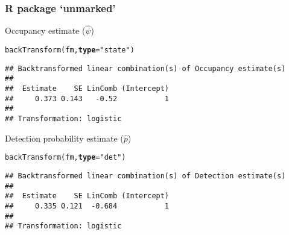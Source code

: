 \documentclass[color=usenames,dvipsnames]{beamer}\usepackage[]{graphicx}\usepackage[]{xcolor}
\makeatletter
\newcommand{\hlsng}[1]{\textcolor[rgb]{0.749,0.012,0.012}{#1}}%
\newcommand{\hldef}[1]{\textcolor[rgb]{0,0,0}{#1}}%
\newcommand{\hlkwc}[1]{\textcolor[rgb]{0,0,0}{\textbf{#1}}}%
\newcommand{\hlkwd}[1]{\textcolor[rgb]{0.004,0.004,0.506}{#1}}%
\newenvironment{kframe}{%
 \def\at@end@of@kframe{}%
 \ifinner\ifhmode%
  \def\at@end@of@kframe{\end{minipage}}%
  \begin{minipage}{\columnwidth}%
 \fi\fi%
 \def\FrameCommand##1{\hskip\@totalleftmargin \hskip-\fboxsep
 \colorbox{shadecolor}{##1}\hskip-\fboxsep
     \hskip-\linewidth \hskip-\@totalleftmargin \hskip\columnwidth}%
 \MakeFramed {\advance\hsize-\width
   \@totalleftmargin\z@ \linewidth\hsize
   \@setminipage}}%
 {\par\unskip\endMakeFramed%
 \at@end@of@kframe}
\newenvironment{knitrout}{}{} %
\makeatother
\begin{document}
\begin{frame}[fragile]
  \frametitle{R package `unmarked'}
Occupancy estimate ($\hat{\psi}$)
\begin{knitrout}\footnotesize
{}\color{fgcolor}\begin{kframe}
\begin{alltt}
\hlkwd{backTransform}\hldef{(fm,} \hlkwc{type}\hldef{=}\hlsng{"state"}\hldef{)}
\end{alltt}
\begin{verbatim}
## Backtransformed linear combination(s) of Occupancy estimate(s)
## 
##  Estimate    SE LinComb (Intercept)
##     0.373 0.143   -0.52           1
## 
## Transformation: logistic
\end{verbatim}
\end{kframe}
\end{knitrout}
\pause
\vfill
Detection probability estimate ($\hat{p}$)
\begin{knitrout}\footnotesize
{}\color{fgcolor}\begin{kframe}
\begin{alltt}
\hlkwd{backTransform}\hldef{(fm,} \hlkwc{type}\hldef{=}\hlsng{"det"}\hldef{)}
\end{alltt}
\begin{verbatim}
## Backtransformed linear combination(s) of Detection estimate(s)
## 
##  Estimate    SE LinComb (Intercept)
##     0.335 0.121  -0.684           1
## 
## Transformation: logistic
\end{verbatim}
\end{kframe}
\end{knitrout}
\end{frame}



\end{document}
